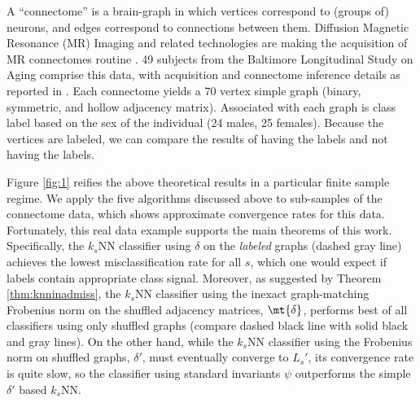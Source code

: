 \documentclass[10pt,journal,cspaper,compsoc]{IEEEtran}
\begin{document}
A ``connectome'' is a brain-graph in which vertices correspond to (groups of) neurons, and edges correspond to connections between them.  Diffusion Magnetic Resonance (MR) Imaging and related technologies are making the acquisition of MR connectomes routine \cite{Hagmann2010}.  49 subjects from the Baltimore Longitudinal Study on Aging comprise this data, with acquisition and connectome inference details as reported in \cite{Gray11}.  Each connectome yields a $70$ vertex simple graph (binary, symmetric, and hollow adjacency matrix).  Associated with each graph is class label based on the sex of the individual (24 males, 25 females).  Because the vertices are labeled, we can compare the results of having the labels and not having the labels.  

Figure \ref{fig:1} reifies the above theoretical results in a particular finite sample regime.  We apply the five algorithms discussed above to sub-samples of the connectome data, which shows approximate convergence rates for this data.  Fortunately, this real data example supports the main theorems of this work.  Specifically, the $k_s$NN classifier using $\delta$ on the \emph{labeled} graphs (dashed gray line) achieves the lowest misclassification rate for all $s$, which one would expect if labels contain appropriate class signal.  Moreover, as suggested by 
Theorem \ref{thm:knninadmiss},
the $k_s$NN classifier using the inexact graph-matching Frobenius norm on the shuffled adjacency matrices, $\mt{\delta}$, performs best of all classifiers using only shuffled graphs (compare dashed black line with solid black and gray lines).  On the other hand, while the $k_s$NN classifier using the Frobenius norm on shuffled graphs, $\delta'$, must eventually converge to $L_s'$, its convergence rate is quite slow, so the classifier using standard invariants $\psi$ outperforms the simple $\delta'$ based $k_s$NN.


% 
\end{document}
